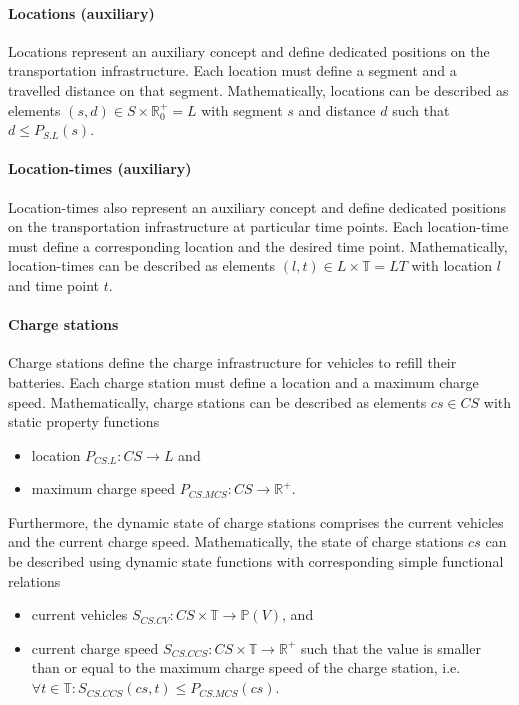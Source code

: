 \documentclass{IEEEtran}
\begin{document}
    \paragraph{Locations (auxiliary)}
    Locations represent an auxiliary concept and define dedicated positions on the transportation infrastructure.
    Each location must define a segment and a travelled distance on that segment.
    Mathematically, locations can be described as elements $(s, d) \in S \times \mathbb{R}_0^+ = L$ with segment $s$ and distance $d$ such that $d \leq P_{S.L}(s)$.

    \paragraph{Location-times (auxiliary)}
    Location-times also represent an auxiliary concept and define dedicated positions on the transportation infrastructure at particular time points.
    Each location-time must define a corresponding location and the desired time point.
    Mathematically, location-times can be described as elements $(l, t) \in L \times \mathbb{T} = LT$ with location $l$ and time point $t$.

    \paragraph{Charge stations}
    Charge stations define the charge infrastructure for vehicles to refill their batteries.
    Each charge station must define a location and a maximum charge speed.
    Mathematically, charge stations can be described as elements $cs \in CS$ with static property functions
    \begin{itemize}
        \item location $P_{CS.L}: CS \rightarrow L$ and
        \item maximum charge speed $P_{CS.MCS}: CS \rightarrow \mathbb{R}^+$.
    \end{itemize}
    Furthermore, the dynamic state of charge stations comprises the current vehicles and the current charge speed.
    Mathematically, the state of charge stations $cs$ can be described using dynamic state functions with corresponding simple functional relations
    \begin{itemize}
        \item current vehicles $S_{CS.CV}: CS \times \mathbb{T} \rightarrow \mathbb{P}(V)$, and
        \item current charge speed $S_{CS.CCS}: CS \times \mathbb{T} \rightarrow \mathbb{R}^+$ such that the value is smaller than or equal to the maximum charge speed of the charge station, i.e.\ $\forall t \in \mathbb{T}: S_{CS.CCS}(cs,t) \leq P_{CS.MCS}(cs)$.
    \end{itemize}
\end{document}
